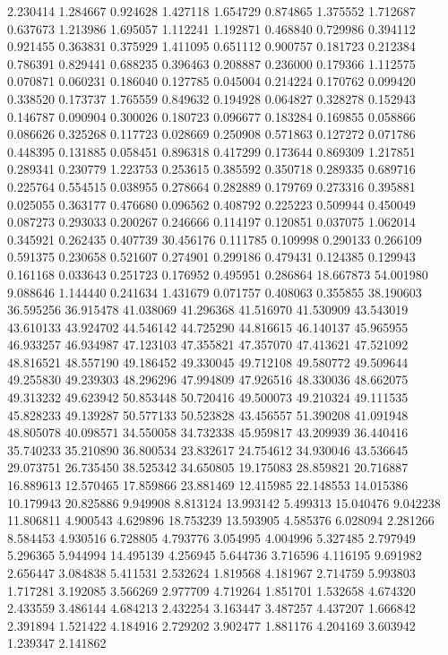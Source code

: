 2.230414
1.284667
0.924628
1.427118
1.654729
0.874865
1.375552
1.712687
0.637673
1.213986
1.695057
1.112241
1.192871
0.468840
0.729986
0.394112
0.921455
0.363831
0.375929
1.411095
0.651112
0.900757
0.181723
0.212384
0.786391
0.829441
0.688235
0.396463
0.208887
0.236000
0.179366
1.112575
0.070871
0.060231
0.186040
0.127785
0.045004
0.214224
0.170762
0.099420
0.338520
0.173737
1.765559
0.849632
0.194928
0.064827
0.328278
0.152943
0.146787
0.090904
0.300026
0.180723
0.096677
0.183284
0.169855
0.058866
0.086626
0.325268
0.117723
0.028669
0.250908
0.571863
0.127272
0.071786
0.448395
0.131885
0.058451
0.896318
0.417299
0.173644
0.869309
1.217851
0.289341
0.230779
1.223753
0.253615
0.385592
0.350718
0.289335
0.689716
0.225764
0.554515
0.038955
0.278664
0.282889
0.179769
0.273316
0.395881
0.025055
0.363177
0.476680
0.096562
0.408792
0.225223
0.509944
0.450049
0.087273
0.293033
0.200267
0.246666
0.114197
0.120851
0.037075
1.062014
0.345921
0.262435
0.407739
30.456176
0.111785
0.109998
0.290133
0.266109
0.591375
0.230658
0.521607
0.274901
0.299186
0.479431
0.124385
0.129943
0.161168
0.033643
0.251723
0.176952
0.495951
0.286864
18.667873
54.001980
9.088646
1.144440
0.241634
1.431679
0.071757
0.408063
0.355855
38.190603
36.595256
36.915478
41.038069
41.296368
41.516970
41.530909
43.543019
43.610133
43.924702
44.546142
44.725290
44.816615
46.140137
45.965955
46.933257
46.934987
47.123103
47.355821
47.357070
47.413621
47.521092
48.816521
48.557190
49.186452
49.330045
49.712108
49.580772
49.509644
49.255830
49.239303
48.296296
47.994809
47.926516
48.330036
48.662075
49.313232
49.623942
50.853448
50.720416
49.500073
49.210324
49.111535
45.828233
49.139287
50.577133
50.523828
43.456557
51.390208
41.091948
48.805078
40.098571
34.550058
34.732338
45.959817
43.209939
36.440416
35.740233
35.210890
36.800534
23.832617
24.754612
34.930046
43.536645
29.073751
26.735450
38.525342
34.650805
19.175083
28.859821
20.716887
16.889613
12.570465
17.859866
23.881469
12.415985
22.148553
14.015386
10.179943
20.825886
9.949908
8.813124
13.993142
5.499313
15.040476
9.042238
11.806811
4.900543
4.629896
18.753239
13.593905
4.585376
6.028094
2.281266
8.584453
4.930516
6.728805
4.793776
3.054995
4.004996
5.327485
2.797949
5.296365
5.944994
14.495139
4.256945
5.644736
3.716596
4.116195
9.691982
2.656447
3.084838
5.411531
2.532624
1.819568
4.181967
2.714759
5.993803
1.717281
3.192085
3.566269
2.977709
4.719264
1.851701
1.532658
4.674320
2.433559
3.486144
4.684213
2.432254
3.163447
3.487257
4.437207
1.666842
2.391894
1.521422
4.184916
2.729202
3.902477
1.881176
4.204169
3.603942
1.239347
2.141862
